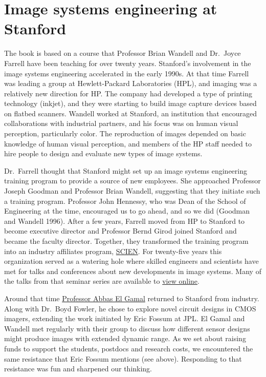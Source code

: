 \documentclass[
  letterpaper,
]{book}
\begin{document}
\section*{Image systems engineering at
Stanford}\label{image-systems-engineering-at-stanford}


The book is based on a course that Professor Brian Wandell and Dr.~Joyce
Farrell have been teaching for over twenty years. Stanford's involvement
in the image systems engineering accelerated in the early 1990s. At that
time Farrell was leading a group at Hewlett-Packard Laboratories (HPL),
and imaging was a relatively new direction for HP. The company had
developed a type of printing technology (inkjet), and they were starting
to build image capture devices based on flatbed scanners. Wandell worked
at Stanford, an institution that encouraged collaborations with
industrial partners, and his focus was on human visual perception,
particularly color. The reproduction of images depended on basic
knowledge of human visual perception, and members of the HP staff needed
to hire people to design and evaluate new types of image systems.

Dr.~Farrell thought that Stanford might set up an image systems
engineering training program to provide a source of new employees. She
approached Professor Joseph Goodman and Professor Brian Wandell,
suggesting that they initiate such a training program. Professor John
Hennessy, who was Dean of the School of Engineering at the time,
encouraged us to go ahead, and so we did (Goodman and Wandell 1996).
After a few years, Farrell moved from HP to Stanford to become executive
director and Professor Bernd Girod joined Stanford and became the
faculty director. Together, they transformed the training program into
an industry affiliates program,
\href{https://scien.stanford.edu/}{SCIEN}. For twenty-five years this
organization served as a watering hole where skilled engineers and
scientists have met for talks and conferences about new developments in
image systems. Many of the talks from that seminar series are available
to
\href{https://scien.stanford.edu/index.php/events/scien-seminars/}{view
online}.

Around that time
\href{https://profiles.stanford.edu/abbas-el-gamal}{Professor Abbas El
Gamal} returned to Stanford from industry. Along with Dr.~Boyd Fowler,
he chose to explore novel circuit designs in CMOS imagers, extending the
work initiated by Eric Fossum at JPL. El Gamal and Wandell met regularly
with their group to discuss how different sensor designs might produce
images with extended dynamic range. As we set about raising funds to
support the students, postdocs and research costs, we encountered the
same resistance that Eric Fossum mentions (see above). Responding to
that resistance was fun and sharpened our thinking.
\end{document}
